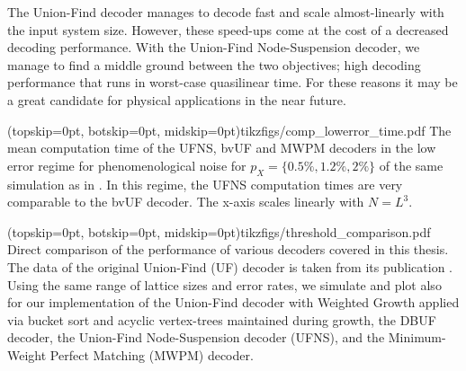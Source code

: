 The Union-Find decoder manages to decode fast and scale almost-linearly with the input system size. However, these speed-ups come at the cost of a decreased decoding performance. With the Union-Find Node-Suspension decoder, we manage to find a middle ground between the two objectives; high decoding performance that runs in worst-case quasilinear time. For these reasons it may be a great candidate for physical applications in the near future.

\Figure[b!](topskip=0pt, botskip=0pt, midskip=0pt){tikzfigs/comp_lowerror_time.pdf}{
  The mean computation time of the UFNS, bvUF and MWPM decoders in the low error regime for phenomenological noise for $p_X = \{0.5\%, 1.2\%, 2\%\}$ of the same simulation as in . In this regime, the UFNS computation times are very comparable to the bvUF decoder. The x-axis scales linearly with $N = L^3$. \label{comp_lowerror_time}}


\Figure[htb](topskip=0pt, botskip=0pt, midskip=0pt){tikzfigs/threshold_comparison.pdf}{
  Direct comparison of the performance of various decoders covered in this thesis. The data of the original Union-Find (UF) decoder is taken from its publication \cite{delfosse2017almost}. Using the same range of lattice sizes and error rates, we simulate and plot also for our implementation of the Union-Find decoder with Weighted Growth applied via bucket sort and acyclic vertex-trees maintained during growth, the DBUF decoder, the Union-Find Node-Suspension decoder (UFNS), and the Minimum-Weight Perfect Matching (MWPM) decoder.\label{thres_comp}}